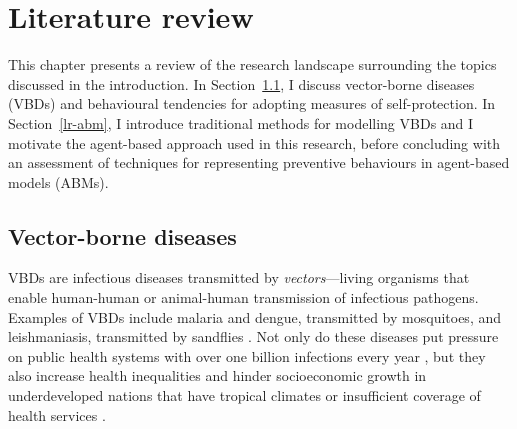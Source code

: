 \section{Literature review}\label{sec:lit_review}

This chapter presents a review of the research landscape surrounding the topics discussed in the introduction. In Section~\ref{lr-vbds}, I discuss vector-borne diseases (VBDs) and behavioural tendencies for adopting measures of self-protection. In Section~\ref{lr-abm}, I introduce traditional methods for modelling VBDs and I motivate the agent-based approach used in this research, before concluding with an assessment of techniques for representing preventive behaviours in agent-based models (ABMs).



\subsection{Vector-borne diseases}\label{lr-vbds}

VBDs are infectious diseases transmitted by \textit{vectors}---living organisms that enable human-human or animal-human transmission of infectious pathogens. Examples of VBDs include malaria and dengue, transmitted by mosquitoes, and leishmaniasis, transmitted by sandflies \cite{world_health_organisation_who_vector-borne_2020}. Not only do these diseases put pressure on public health systems with over one billion infections every year \cite{world_health_organisation_who_global_2004}, but they also increase health inequalities and hinder socioeconomic growth in underdeveloped nations that have tropical climates or insufficient coverage of health services \cite{campbell-lendrum_climate_2015}.



